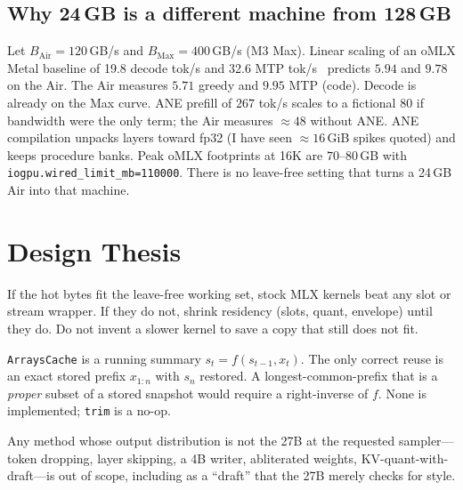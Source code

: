 \subsection{\texorpdfstring{Why 24\,GB is a different machine from 128\,GB}{Why 24 GB is a different machine from 128 GB}}

Let $B_{\mathrm{Air}}{=}120$\,GB/s and $B_{\mathrm{Max}}{=}400$\,GB/s (M3 Max). Linear scaling of an oMLX Metal baseline of 19.8 decode tok/s and 32.6 MTP tok/s~\citep{omlx2874} predicts $5.94$ and $9.78$ on the Air. The Air measures $5.71$ greedy and $9.95$ MTP (code). Decode is already on the Max curve. ANE prefill of $267$ tok/s scales to a fictional $80$ if bandwidth were the only term; the Air measures $\approx 48$ without ANE. ANE compilation unpacks layers toward fp32 (I have seen $\approx 16$\,GiB spikes quoted) and keeps procedure banks. Peak oMLX footprints at 16K are $70$--$80$\,GB with \texttt{iogpu.wired\_limit\_mb=110000}. There is no leave-free setting that turns a 24\,GB Air into that machine.

\section{Design Thesis}
\label{sec:thesis}

\begin{proposition}
If the hot bytes fit the leave-free working set, stock MLX kernels beat any slot or stream wrapper. If they do not, shrink residency (slots, quant, envelope) until they do. Do not invent a slower kernel to save a copy that still does not fit.
\end{proposition}

\begin{proposition}
\texttt{ArraysCache} is a running summary $s_t = f(s_{t-1}, x_t)$. The only correct reuse is an exact stored prefix $x_{1:n}$ with $s_n$ restored. A longest-common-prefix that is a \emph{proper} subset of a stored snapshot would require a right-inverse of $f$. None is implemented; \texttt{trim} is a no-op.
\end{proposition}

\begin{proposition}
Any method whose output distribution is not the 27B at the requested sampler---token dropping, layer skipping, a 4B writer, abliterated weights, KV-quant-with-draft---is out of scope, including as a ``draft'' that the 27B merely checks for style.
\end{proposition}

